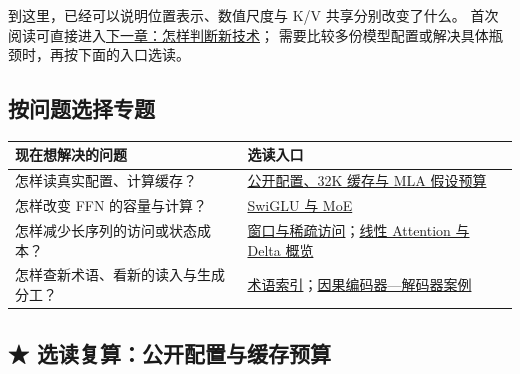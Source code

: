 \label{route:modern-core-end}

\par\smallskip
到这里，已经可以说明位置表示、数值尺度与 K/V 共享分别改变了什么。
首次阅读可直接进入\hyperref[intro:23e-tech-judgement]{下一章：怎样判断新技术}；
需要比较多份模型配置或解决具体瓶颈时，再按下面的入口选读。

\subsection*{按问题选择专题}
\begin{center}\small
{}
\begin{tabularx}{\linewidth}{@{}p{53mm}X@{}}
\toprule
现在想解决的问题 & 选读入口\\\midrule
怎样读真实配置、计算缓存？ & \hyperref[sec:modern-config-budget]{公开配置、32K 缓存与 MLA 假设预算}\\
怎样改变 FFN 的容量与计算？ & \hyperref[elective:architecture-extras]{SwiGLU 与 MoE}\\
怎样减少长序列的访问或状态成本？ & \hyperref[sec:modern-sparse-access]{窗口与稀疏访问}；\hyperref[sec:modern-linear-state]{线性 Attention 与 Delta 概览}\\
怎样查新术语、看新的读入与生成分工？ & \hyperref[sec:modern-term-index]{术语索引}；\hyperref[elective:causal-encoder-decoder]{因果编码器—解码器案例}\\
\bottomrule
\end{tabularx}
\end{center}

\subsection{\texorpdfstring{{\symboliconfont ★}}{★} 选读复算：公开配置与缓存预算}
\label{sec:modern-config-budget}

